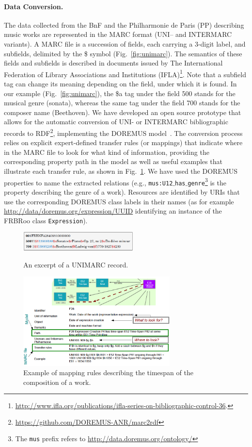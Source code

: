 \documentclass[runningheads,a4paper]{llncs}
\begin{document}
\paragraph{{\bf Data Conversion.}} The data collected from the BnF and the Philharmonie de Paris (PP) describing music works are represented in the MARC format (UNI-- and INTERMARC variants). A MARC file is a succession of fields, each carrying a 3-digit label, and subfields, delimited by the \$ symbol (Fig.~\ref{fig:unimarc}). The semantics of these fields and subfields is described in documents issued by The International Federation of Library Associations and Institutions (IFLA)\footnote{\url{http://www.ifla.org/publications/ifla-series-on-bibliographic-control-36}.}. Note that a subfield tag can change its meaning depending on the field, under which it is found. In our example (Fig.~\ref{fig:unimarc}), the \$a tag under the field 500 stands for the musical genre (sonata), whereas the same tag under the field 700 stands for the composer name (Beethoven). We have developed an open source prototype that allows for the automatic conversion of UNI- or INTERMARC bibliographic records to RDF\footnote{\url{https://github.com/DOREMUS-ANR/marc2rdf}}, implementing the DOREMUS model~\cite{choffe2016doremus}. The conversion process relies on explicit expert-defined transfer rules (or mappings) that indicate where in the MARC file to look for what kind of information, providing the corresponding property path in the model as well as useful examples that illustrate each transfer rule, as shown in Fig.~\ref{fig:mappings}. We have used the DOREMUS properties to name the extracted relations (e.g., \texttt{mus:U12$\_$has$\_$genre}\footnote{The \texttt{mus} prefix refers to \url{http://data.doremus.org/ontology/}} is the property describing the genre of a work). Resources are identified by URIs that use the corresponding DOREMUS class labels in their names (as for example \url{http://data/doremus.org/expression/UUID} identifying an instance of the FRBRoo class \texttt{Expression}).
\begin{figure}
  \centering
  \includegraphics[width=6cm]{img/marc-exmpl-simple.png}
  \caption{An excerpt of a UNIMARC record.}
  \label{fig:unimarc}
\smallskip
  \centering
  \includegraphics[width=8cm]{img/mapping-rules.png}
  \caption{Example of mapping rules describing the timespan of the composition of a work.}
  \label{fig:mappings}
\end{figure}
\end{document}
